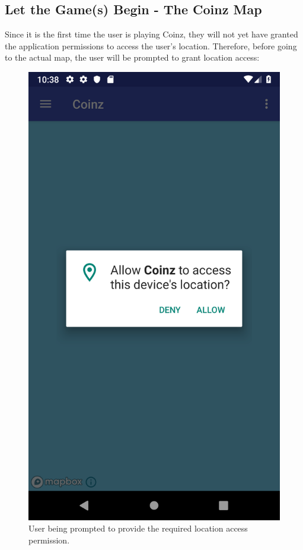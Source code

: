 \documentclass[11pt,a4paper,notitlepage]{article}
\begin{document}
\subsection{Let the Game(s) Begin - The Coinz Map}

    Since it is the first time the user is playing Coinz, they will not yet have granted the application permissions to access the user's location. Therefore, before going to the actual map, the user will be prompted to grant location access:

\begin{figure}[H]
    \centering
    \includegraphics[scale=0.25]{screenshots/map/asking-for-permissions.png}
    \caption{User being prompted to provide the required location access permission.}
\end{figure}
\end{document}
